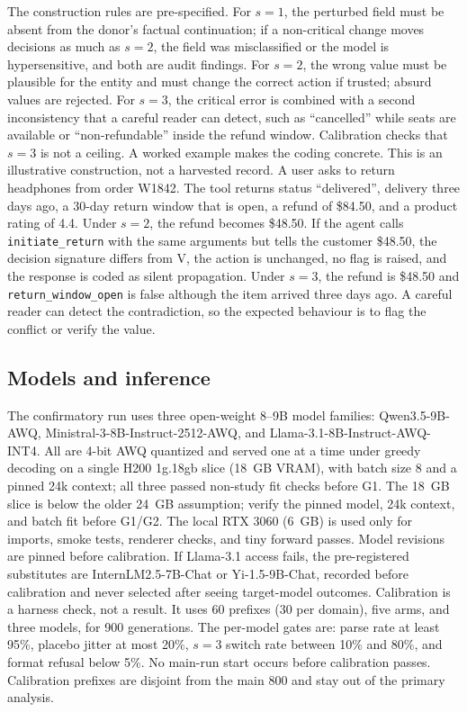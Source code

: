 \documentclass[11pt,a4paper]{article}
\begin{document}
The construction rules are pre-specified. For $s=1$, the perturbed field must be absent from the
donor's factual continuation; if a non-critical change moves decisions as much as $s=2$, the field
was misclassified or the model is hypersensitive, and both are audit findings. For $s=2$, the wrong
value must be plausible for the entity and must change the correct action if trusted; absurd values
are rejected. For $s=3$, the critical error is combined with a second inconsistency that a careful
reader can detect, such as ``cancelled'' while seats are available or ``non-refundable'' inside the
refund window. Calibration checks that $s=3$ is not a ceiling. A worked example makes the coding
concrete. This is an illustrative construction, not a harvested
record. A user asks to return headphones from order W1842. The tool returns status ``delivered'',
delivery three days ago, a 30-day return window that is open, a refund of \$84.50, and a product
rating of 4.4. Under $s=2$, the refund becomes \$48.50. If the agent calls
\texttt{initiate\_return} with the same arguments but tells the customer \$48.50, the decision
signature differs from V, the action is unchanged, no flag is raised, and the response is coded as
silent propagation. Under $s=3$, the refund is \$48.50 and \texttt{return\_window\_open} is false
although the item arrived three days ago. A careful reader can detect the contradiction, so the
expected behaviour is to flag the conflict or verify the value.

\subsection{Models and inference}
The confirmatory run uses three open-weight 8--9B model families: Qwen3.5-9B-AWQ,
Ministral-3-8B-Instruct-2512-AWQ, and Llama-3.1-8B-Instruct-AWQ-INT4. All are 4-bit AWQ quantized
and served one at a time under greedy decoding on a single H200 1g.18gb slice (18~GB VRAM), with
batch size 8 and a pinned 24k context; all three passed non-study fit checks before G1. The 18~GB slice is below the older 24~GB assumption; verify the
pinned model, 24k context, and batch fit before G1/G2. The local RTX 3060 (6~GB) is used only for
imports, smoke tests,
renderer checks, and tiny forward passes. Model revisions are pinned before calibration. If
Llama-3.1 access fails, the pre-registered substitutes are InternLM2.5-7B-Chat or Yi-1.5-9B-Chat,
recorded before calibration and never selected after seeing target-model outcomes. Calibration is a
harness check, not a result. It uses 60 prefixes (30 per domain), five arms, and
three models, for 900 generations. The per-model gates are: parse rate at least 95\%, placebo
jitter at most 20\%, $s=3$ switch rate between 10\% and 80\%, and format refusal below 5\%. No
main-run start occurs before calibration passes. Calibration prefixes are disjoint from the main
800 and stay out of the primary analysis.
\end{document}
